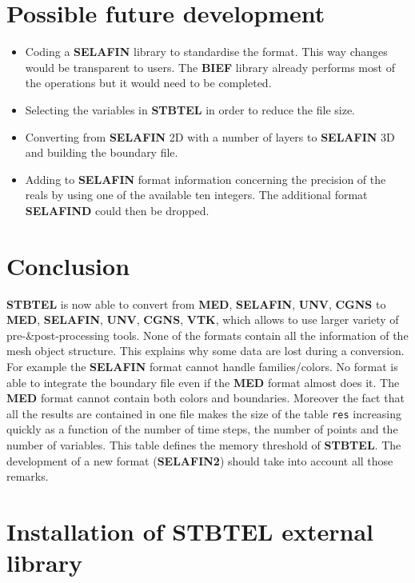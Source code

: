 \documentclass[a4paper,10pt]{article}
\newcommand{\stb}{\textbf{STBTEL}\xspace}
\newcommand{\bief}{\textbf{BIEF}\xspace}
\newcommand{\slf}{\textbf{SELAFIN}\xspace}
\newcommand{\unv}{\textbf{UNV}\xspace}
\newcommand{\med}{\textbf{MED}\xspace}
\newcommand{\vtk}{\textbf{VTK}\xspace}
\newcommand{\cgns}{\textbf{CGNS}\xspace}
\begin{document}
\section{\label{improvment}Possible future development}

\begin{itemize}
\setlength{\itemsep}{1pt}
\setlength{\parskip}{0pt}
\setlength{\parsep}{0pt}
\item Coding a \slf library to standardise the format. This way changes would
be transparent to users.  The \bief library already performs most of the
operations but it would need to be completed.
\item Selecting the variables in \stb in order to reduce the file size.
\item Converting from \slf 2D with a number of layers to \slf 3D and building
the boundary file.
\item Adding to \slf format information concerning the precision of the reals
by using one of the available ten integers.  The additional format
\textbf{SELAFIND} could then be dropped.
\end{itemize}

\section{Conclusion}
\stb is now able to convert from \med, \slf, \unv, \cgns  to \med, \slf, \unv,
\cgns, \vtk, which allows to use larger variety of pre-\&post-processing tools.
None of the formats contain all the information of the mesh object structure.
This explains why some data are lost during a conversion.  For example the \slf
format cannot handle families/colors. No format is able to integrate the
boundary file even if the \med format almost does it.
The \med format cannot contain both colors and boundaries.  Moreover the fact
that all the results are contained in one file makes the size of the table
\verb+res+ increasing quickly as a function of the number of time steps, the
number of points and the number of variables. This table defines the memory
threshold of \stb.  The development of a new format (\textbf{SELAFIN2}) should
take into account all those remarks. 

\newpage
\appendix
\appendixpage


\section{Installation of \stb external library}
\end{document}
